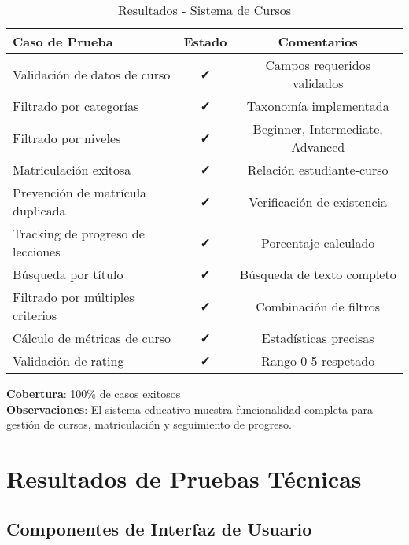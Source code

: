 \documentclass[12pt,a4paper]{article}
\begin{document}
\begin{table}[H]
\centering
\caption{Resultados - Sistema de Cursos}
\begin{tabular}{@{}p{6cm}cc@{}}
\toprule
\textbf{Caso de Prueba} & \textbf{Estado} & \textbf{Comentarios} \\
\midrule
Validación de datos de curso & \textcolor{successgreen}{\textbf{✓}} & Campos requeridos validados \\
Filtrado por categorías & \textcolor{successgreen}{\textbf{✓}} & Taxonomía implementada \\
Filtrado por niveles & \textcolor{successgreen}{\textbf{✓}} & Beginner, Intermediate, Advanced \\
Matriculación exitosa & \textcolor{successgreen}{\textbf{✓}} & Relación estudiante-curso \\
Prevención de matrícula duplicada & \textcolor{successgreen}{\textbf{✓}} & Verificación de existencia \\
Tracking de progreso de lecciones & \textcolor{successgreen}{\textbf{✓}} & Porcentaje calculado \\
Búsqueda por título & \textcolor{successgreen}{\textbf{✓}} & Búsqueda de texto completo \\
Filtrado por múltiples criterios & \textcolor{successgreen}{\textbf{✓}} & Combinación de filtros \\
Cálculo de métricas de curso & \textcolor{successgreen}{\textbf{✓}} & Estadísticas precisas \\
Validación de rating & \textcolor{successgreen}{\textbf{✓}} & Rango 0-5 respetado \\
\bottomrule
\end{tabular}
\end{table}

\textbf{Cobertura}: 100\% de casos exitosos \\
\textbf{Observaciones}: El sistema educativo muestra funcionalidad completa para gestión de cursos, matriculación y seguimiento de progreso.

\section{Resultados de Pruebas Técnicas}

\subsection{Componentes de Interfaz de Usuario}
\end{document}

